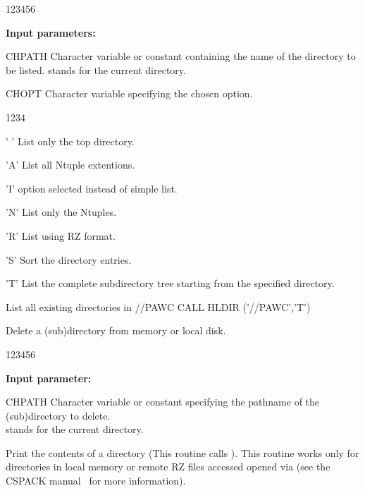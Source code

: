 \begin{DLtt}{123456}
\item[{\rm\bf Input parameters:}]
\item[CHPATH] Character
variable or constant containing the name of the directory to be listed.
 stands for the current directory.
\item[CHOPT] Character variable specifying the chosen option.
\begin{DLtt}{1234}
\item[' '] List only the top directory.
\item['A'] List all Ntuple extentions.
\item['I']  option selected instead of simple list.
\item['N'] List only the Ntuples.
\item['R'] List using RZ format.
\item['S'] Sort the directory entries.
\item['T'] List the complete subdirectory tree starting
from the specified directory.
\end{DLtt}
\end{DLtt}
\newpage 
\begin{XMPt}{List all existing directories in //PAWC} 
CALL HLDIR ('//PAWC','T')
\end{XMPt}

 
\Action
Delete a (sub)directory from memory or local disk.
 
\begin{DLtt}{123456}
\item[{\rm\bf Input parameter:}]
\item[CHPATH] Character variable or constant specifying 
              the pathname of the (sub)directory to delete.\\
               stands for the current directory.
\end{DLtt}
 

 
\Action
Print the contents of a directory (This routine calls
).
This routine works only for directories in local memory
or remote RZ files accessed opened via  (see
the CSPACK manual~\cite{bib-CSPACK} for more information).
 
